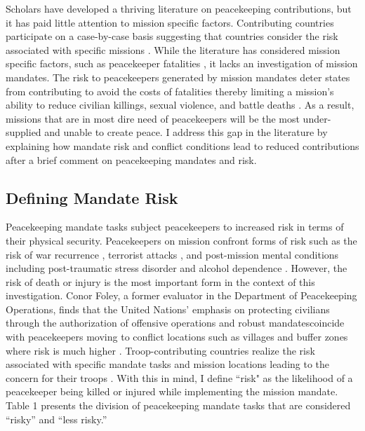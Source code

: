 \documentclass[12pt]{article}
\begin{document}

Scholars have developed a thriving literature on peacekeeping contributions, but it has paid little attention to mission specific factors. Contributing countries participate on a case-by-case basis \citep{leck2009,allen2014} suggesting that countries consider the risk associated with specific missions \citep{bullion1997india}. While the literature has considered mission specific factors, such as peacekeeper fatalities \citep{bove2011,levin2021}, it lacks an investigation of mission mandates. The risk to peacekeepers generated by mission mandates deter states from contributing to avoid the costs of fatalities thereby limiting a mission's ability to reduce civilian killings, sexual violence, and battle deaths \citep{hultman2013united,kirschner2019does,hultman2014beyond}. As a result, missions that are in most dire need of peacekeepers will be the most under-supplied and unable to create peace. I address this gap in the literature by explaining how mandate risk and conflict conditions lead to reduced contributions after a brief comment on peacekeeping mandates and risk. 

\subsection*{Defining Mandate Risk} 

Peacekeeping mandate tasks subject peacekeepers to increased risk in terms of their physical security. Peacekeepers on mission confront forms of risk such as the risk of war recurrence \citep{fortna2008}, terrorist attacks \citep{hansen2020}, and post-mission mental conditions including post-traumatic stress disorder and alcohol dependence \citep{forbes2016}. However, the risk of death or injury is the most important form in the context of this investigation. Conor Foley, a former evaluator in the Department of Peacekeeping Operations, finds that the United Nations' emphasis on protecting civilians through the authorization of offensive operations and robust mandates\footnotemark[4] coincide with peacekeepers moving to conflict locations such as villages and buffer zones where risk is much higher \citep{martin_2018}. Troop-contributing countries realize the risk associated with specific mandate tasks and mission locations leading to the concern for their troops \citep{karlsrud2015,henke2019}. With this in mind, I define ``risk" as the likelihood of a peacekeeper being killed or injured while implementing the mission mandate. Table 1 presents the division of peacekeeping mandate tasks that are considered ``risky'' and ``less risky.''
\end{document}
